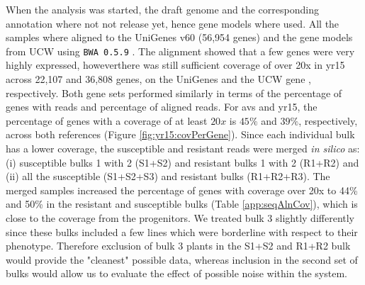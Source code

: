 

When the analysis was started, the draft genome and the corresponding annotation where not not release yet, hence gene models where used. 
All the samples where aligned to the UniGenes v60 (56,954 genes) and the gene models from UCW \citep{Krasileva2013} using \verb|BWA 0.5.9| \citep{Li2009}. 
The alignment  showed that a few genes were very highly expressed, howeverthere was still sufficient coverage of over 20x in \gls{yr15} across 22,107 and 36,808 genes, on the UniGenes and the UCW gene , respectively. 
Both gene sets performed similarly in terms of the percentage of genes with reads and percentage of aligned reads. 
For \gls{avs} and \gls{yr15}, the percentage of genes with a coverage of at least $20x$ is $45\%$ and $39\%$, respectively, across both references (Figure \ref{fig:yr15:covPerGene}).
Since each individual bulk has a lower coverage, the susceptible and resistant reads were merged \textit{in silico} as: (i) susceptible bulks 1 with 2 (S1+S2) and resistant bulks 1 with 2 (R1+R2) and (ii) all the susceptible (S1+S2+S3) and resistant bulks (R1+R2+R3). 
The merged samples increased the percentage of genes with coverage over 20x  to 44\% and 50\% in the resistant and susceptible bulks (Table \ref{app:seqAlnCov}), which is close to the coverage from the progenitors.
We treated bulk 3 slightly differently since these bulks included a few lines which were borderline with respect to their phenotype. 
Therefore exclusion of bulk 3 plants in the S1+S2 and R1+R2 bulk would provide the "cleanest" possible data, whereas inclusion in the second set of bulks would allow us to evaluate the effect of possible noise within the system. 

